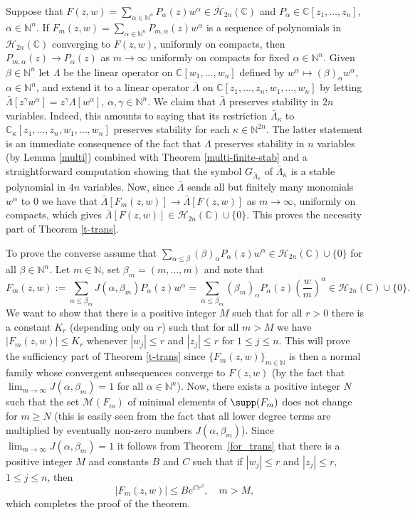 \documentclass[10pt,reqno]{amsart}
\theoremstyle{plain}
\theoremstyle{definition}
\theoremstyle{remark}
\numberwithin{equation}{section}
\newcommand{\NN}{\mathbb{N}}
\newcommand{\HH}{\mathcal{H}}
\newcommand{\MM}{\mathcal{M}}
\newcommand{\HHH}{\overline{\mathcal{H}}}
\newcommand{\CC}{\mathbb{C}}
\begin{document}
Suppose that  $F(z,w)=\sum_{\alpha \in \NN^n}P_\alpha(z)w^\alpha\in 
\HHH_{2n}(\CC)$ and $P_\alpha\in\CC[z_1,\ldots,z_n]$, $\alpha\in\NN^n$. If  
$F_m(z,w) = \sum_{\alpha\in \NN^n} P_{m,\alpha}(z)w^\alpha$ is a sequence of 
polynomials in $\HH_{2n}(\CC)$ converging to $F(z,w)$, uniformly on compacts, 
then $P_{m,\alpha}(z) \rightarrow P_\alpha(z)$ as $m \rightarrow \infty$  
uniformly on compacts for fixed $\alpha \in \NN^n$. Given $\beta\in\NN^n$ 
let $\Lambda$ be the 
linear operator on $\CC[w_1,\ldots, w_n]$ defined by 
$w^\alpha \mapsto (\beta)_\alpha w^\alpha$, $\alpha\in\NN^n$, 
and extend it to a linear operator $\bar{\Lambda}$ on 
$\CC[z_1,\ldots,z_n, w_1,\ldots, w_n]$ by letting 
$\bar{\Lambda}[z^\gamma w^\alpha]=z^\gamma\Lambda[w^\alpha]$, 
$\alpha,\gamma\in\NN^n$. We claim that $\bar{\Lambda}$ 
preserves stability in $2n$ 
variables. Indeed, this amounts 
to saying that its restriction $\bar{\Lambda}_\kappa$ 
to $\CC_\kappa[z_1,\ldots,z_n, w_1,\ldots, w_n]$ preserves stability
for each $\kappa\in\NN^{2n}$. The latter statement is an immediate 
consequence of the fact
that $\Lambda$ preserves stability in $n$ variables (by Lemma \ref{multi}) 
combined with Theorem \ref{multi-finite-stab}  and a straightforward 
computation showing that the symbol $G_{\bar{\Lambda}_\kappa}$ of 
$\bar{\Lambda}_\kappa$ is a stable polynomial in $4n$ variables. 
Now, since $\bar{\Lambda}$ sends all but finitely many monomials 
$w^\alpha$ to $0$ we have that 
$\bar{\Lambda}[F_m(z,w)] \rightarrow \bar{\Lambda}[F(z,w)]$ as 
$m \rightarrow \infty$, uniformly on compacts, which gives 
$\bar{\Lambda}[F(z,w)] \in \HH_{2n}(\CC)\cup\{0\}$. This proves the necessity
part of Theorem \ref{t-trans}.

To prove the converse assume that 
$\sum_{\alpha \leq \beta}(\beta)_{\alpha}P_\alpha(z)w^\alpha\in 
\HH_{2n}(\CC)\cup\{0\}$ for all $\beta\in\NN^n$. Let $m\in\NN$, set
$\beta_m= (m,\ldots,m)$ and note that 
$$
F_m(z,w):=\sum_{\alpha \leq \beta_m} J(\alpha,\beta_m)P_\alpha(z)w^\alpha
=\sum_{\alpha \leq \beta_m}(\beta_m)_{\alpha}
P_\alpha(z)\left(\frac{w}{m}\right)^\alpha\in \HH_{2n}(\CC)\cup\{0\}.
$$
We want to show that there is a positive integer $M$ such that  
for all $r>0$ there is a constant $K_r$ (depending only on $r$) 
such that for all $m>M$ we have 
$|F_m(z,w)| \leq K_r$ whenever $|w_j| \leq r$ and $|z_j| \leq r$ for 
$1\le j\le n$. This will prove the sufficiency part of Theorem \ref{t-trans} 
since $\{F_m(z,w)\}_{m\in\NN}$ is then a normal family  
whose convergent subsequences converge to $F(z,w)$ (by the fact that 
$\lim_{m\rightarrow \infty}J(\alpha,\beta_m) = 1$ for all 
$\alpha \in \NN^n$). Now, there exists a positive integer $N$ such 
that the set $\MM(F_m)$ of minimal elements of $\supp(F_m)$ does not change 
for $m \geq N$ (this is easily seen from the fact that all lower degree terms
are multiplied by eventually non-zero numbers $J(\alpha,\beta_m)$). 
Since $\lim_{m\rightarrow \infty}J(\alpha,\beta_m) = 1$ it follows from 
Theorem~\ref{for_trans} that there is a positive integer $M$ and 
constants $B$ and $C$ such that if $|w_j| \leq r$ and $|z_j| \leq r$, 
$1\le j\le n$, then 
$$
|F_m(z,w)| \leq Be^{Cr^2},  \quad m >M,
$$
which completes the proof of the theorem.
\end{document}
